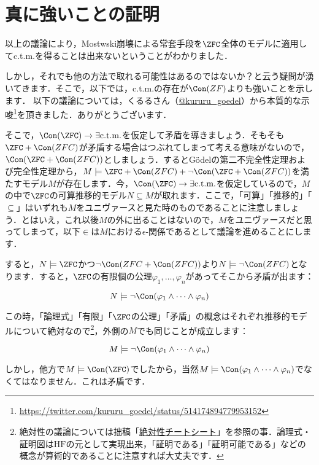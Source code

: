 \documentclass[a4j,uplatex,dvipdfmx]{jsarticle}
\begin{document}
\section{真に強いことの証明}
以上の議論により，Mostwski崩壊による常套手段を$\ZFC$全体のモデルに適用してc.t.m.を得ることは出来ないということがわかりました．

しかし，それでも他の方法で取れる可能性はあるのではないか？と云う疑問が湧いてきます．そこで，以下では，c.t.m.の存在が$\Con(ZF)$よりも強いことを示します．
以下の議論については，くるるさん（\href{https://twitter.com/kururu_goedel}{@kururu\_goedel}）から本質的な示唆\footnote{\url{https://twitter.com/kururu_goedel/status/514174894779953152}}を頂きました．ありがとうございます．

そこで，$\Con(\ZFC) \rightarrow \exists \text{c.t.m.}$を仮定して矛盾を導きましょう．そもそも$\ZFC + \Con(ZFC)$が矛盾する場合はつぶれてしまって考える意味がないので，$\Con(\ZFC + \Con(ZFC))$としましょう．するとG\"{o}delの第二不完全性定理および完全性定理から，$M \models \ZFC + \Con(ZFC) + \neg \Con(\ZFC + \Con(ZFC))$を満たすモデル$M$が存在します．今，$\Con(\ZFC) \rightarrow \exists \text{c.t.m.}$を仮定しているので，$M$の中で$\ZFC$の可算推移的モデル$N \subseteq M$が取れます．ここで，「可算」「推移的」「$\subseteq$」はいずれも$M$をユニヴァースと見た時のものであることに注意しましょう．とはいえ，これ以後$M$の外に出ることはないので，$M$をユニヴァースだと思ってしまって，以下$\in$は$M$における$\epsilon$-関係であるとして議論を進めることにします．

すると，$N \models \ZFC$かつ$\neg \Con(ZFC + \Con(ZFC))$より$N \models \neg \Con(ZFC)$となります．すると，$\ZFC$の有限個の公理$\varphi_1, \dots, \varphi_n$があってそこから矛盾が出ます：

\[
N \models \neg \Con(\varphi_1 \wedge \dots \wedge \varphi_n)
\]

この時，「論理式」「有限」「$\ZFC$の公理」「矛盾」の概念はそれぞれ推移的モデルについて絶対なので\footnote{絶対性の議論については拙稿「\href{http://konn-san.com/math/absoluteness-cheatsheet.html}{絶対性チートシート}」を参照の事．論理式・証明図は$\mathrm{HF}$の元として実現出来，「証明である」「証明可能である」などの概念が算術的であることに注意すれば大丈夫です．}，外側の$M$でも同じことが成立します：

\[
M \models \neg \Con(\varphi_1 \wedge \dots \wedge \varphi_n)
\]

しかし，他方で$M \models \Con(\ZFC)$でしたから，当然$M \models \Con(\varphi_1 \wedge \dots \wedge \varphi_n)$でなくてはなりません．これは矛盾です．

\nocite{Eda:2010}
\printbibliography[title=参考文献]
\end{document}
